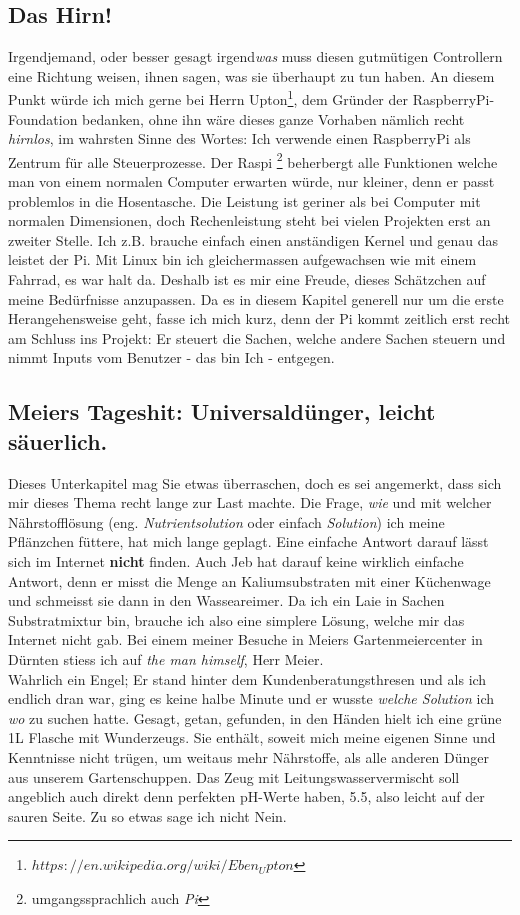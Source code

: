 \documentclass[12pt,titlepage,a4paper]{article}
\begin{document}
\subsection{Das Hirn!}
Irgendjemand, oder besser gesagt irgend\textit{was} muss diesen gutmütigen Controllern eine Richtung weisen, ihnen sagen, was sie überhaupt zu tun haben. An diesem Punkt würde ich mich gerne bei Herrn Upton\footnote{$https://en.wikipedia.org/wiki/Eben_Upton$}, dem Gründer der RaspberryPi-Foundation bedanken, ohne ihn wäre dieses ganze Vorhaben nämlich recht \textit{hirnlos}, im wahrsten Sinne des Wortes: Ich verwende einen RaspberryPi als Zentrum für alle Steuerprozesse. Der Raspi \footnote{umgangssprachlich auch \textit{Pi}} beherbergt alle Funktionen welche man von einem normalen Computer erwarten würde, nur kleiner, denn er passt problemlos in die Hosentasche. Die Leistung ist geriner als bei Computer mit normalen Dimensionen, doch Rechenleistung steht bei vielen Projekten erst an zweiter Stelle. Ich z.B. brauche einfach einen anständigen Kernel und genau das leistet der Pi. Mit Linux bin ich gleichermassen aufgewachsen wie mit einem Fahrrad, es war halt da. Deshalb ist es mir eine Freude, dieses Schätzchen auf meine Bedürfnisse anzupassen. Da es in diesem Kapitel generell nur um die erste Herangehensweise geht, fasse ich mich kurz, denn der Pi kommt zeitlich erst recht am Schluss ins Projekt: Er steuert die Sachen, welche andere Sachen steuern und nimmt Inputs vom Benutzer - das bin Ich - entgegen.


\subsection{Meiers Tageshit: Universaldünger, leicht säuerlich.}
Dieses Unterkapitel mag Sie etwas überraschen, doch es sei angemerkt, dass sich mir dieses Thema recht lange zur Last machte. Die Frage, \textit{wie} und mit welcher Nährstofflösung (eng. \textit{Nutrientsolution} oder einfach \textit{Solution}) ich meine Pflänzchen füttere, hat mich lange geplagt. Eine einfache Antwort darauf lässt sich im Internet \textbf{nicht} finden. Auch Jeb hat darauf keine wirklich einfache Antwort, denn er misst die Menge an Kaliumsubstraten mit einer Küchenwage und schmeisst sie dann in den Wasseareimer. Da ich ein Laie in Sachen Substratmixtur bin, brauche ich also eine simplere Lösung, welche mir das Internet nicht gab. Bei einem meiner Besuche in Meiers Gartenmeiercenter in Dürnten stiess ich auf \textit{the man himself}, Herr Meier. \\ Wahrlich ein Engel; Er stand hinter dem Kundenberatungsthresen und als ich endlich dran war, ging es keine halbe Minute und er wusste \textit{welche Solution} ich \textit{wo} zu suchen hatte. Gesagt, getan, gefunden, in den Händen hielt ich eine grüne 1L Flasche mit Wunderzeugs. Sie enthält, soweit mich meine eigenen Sinne und Kenntnisse nicht trügen, um weitaus mehr Nährstoffe, als alle anderen Dünger aus unserem Gartenschuppen. Das Zeug mit Leitungswasservermischt soll angeblich auch direkt denn perfekten pH-Werte haben, 5.5, also leicht auf der sauren Seite. Zu so etwas sage ich nicht Nein. 
\end{document}
